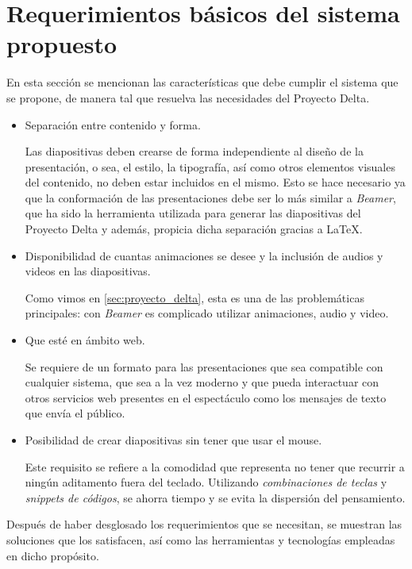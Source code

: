	\section{Requerimientos básicos del sistema propuesto} %
	\label{sec:requerimientos_basicos_del_sistema_propuesto}
		En esta sección se mencionan las características que debe cumplir el sistema que se propone, de manera tal que resuelva las necesidades del Proyecto Delta.
		\begin{itemize}
				\item Separación entre contenido y forma. 

					Las diapositivas deben crearse de forma independiente al diseño de la presentación, o sea, el estilo, la tipografía, así como otros elementos visuales del contenido, no deben estar incluidos en el mismo. Esto se hace necesario ya que la conformación de las presentaciones debe ser lo más similar a \textit{Beamer}, que ha sido la herramienta utilizada para generar las diapositivas del Proyecto Delta y además, propicia dicha separación gracias a \LaTeX{}.

				\item Disponibilidad de cuantas animaciones se desee y la inclusión de audios y videos en las diapositivas. 

					Como vimos en \ref{sec:proyecto_delta}, esta es una de las problemáticas principales: con \textit{Beamer} es complicado utilizar animaciones, audio y video.

				\item Que esté en ámbito web. 

					Se requiere de un formato para las presentaciones que sea compatible con cualquier sistema, que sea a la vez moderno y que pueda interactuar con otros servicios web presentes en el espectáculo como los mensajes de texto que envía el público.


				\item Posibilidad de crear diapositivas sin tener que usar el mouse. 

					Este requisito se refiere a la comodidad que representa no tener que recurrir a ningún aditamento fuera del teclado. Utilizando \textit{combinaciones de teclas} y \textit{snippets de códigos}, se ahorra tiempo y se evita la dispersión del pensamiento.
		\end{itemize}	


	Después de haber desglosado los requerimientos que se necesitan, se muestran las soluciones que los satisfacen, así como las herramientas y tecnologías empleadas en dicho propósito. 

